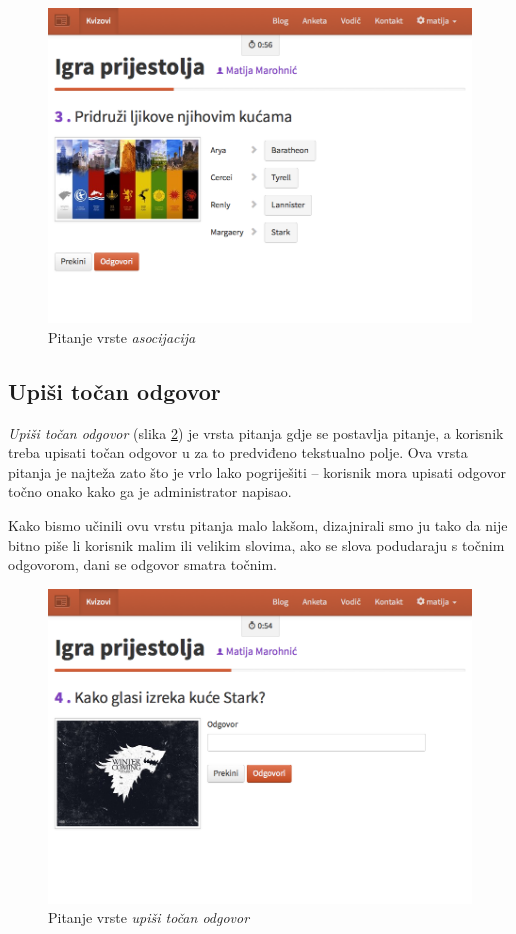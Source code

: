 \documentclass{scrreprt}
\begin{document}
\begin{figure}[H]
  \includegraphics[width=\textwidth, clip=true, trim=0 3cm 0 0, fbox]{student/association_question}
  \caption{Pitanje vrste \emph{asocijacija}}
  \label{fig:association}
\end{figure}

\subsection{Upiši točan odgovor}

\emph{Upiši točan odgovor} (slika \ref{fig:text}) je vrsta pitanja gdje se
postavlja pitanje, a korisnik treba upisati točan odgovor u za to predviđeno
tekstualno polje. Ova vrsta pitanja je najteža zato što je vrlo lako pogriješiti
-- korisnik mora upisati odgovor točno onako kako ga je administrator napisao.

Kako bismo učinili ovu vrstu pitanja malo lakšom, dizajnirali smo ju tako da
nije bitno piše li korisnik malim ili velikim slovima, ako se slova podudaraju s
točnim odgovorom, dani se odgovor smatra točnim.

\begin{figure}[H]
  \includegraphics[width=\textwidth, clip=true, trim=0 5cm 0 0, fbox]{student/text_question}
  \caption{Pitanje vrste \emph{upiši točan odgovor}}
  \label{fig:text}
\end{figure}
\end{document}
